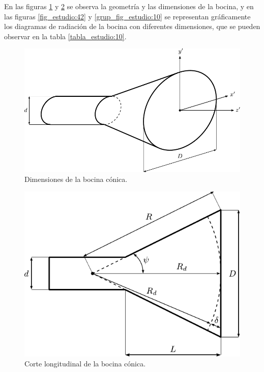 En las figuras \ref{fig_estudio:40} y \ref{fig_estudio:41} se observa la geometría y las dimensiones de la bocina, y en las figuras \ref{fig_estudio:42} y \ref{grup_fig_estudio:10} se representan gráficamente los diagramas de radiación de la bocina con diferentes dimensiones, que se pueden observar en la tabla \ref{tabla_estudio:10}.
\begin{figure}[H]
\centering
\includegraphics[scale = 1]{Figures/Estudio/estudio_40}
\caption{Dimensiones de la bocina cónica.}
\label{fig_estudio:40}
\end{figure}
\begin{figure}[H]
\centering
\includegraphics[scale = 1]{Figures/Estudio/estudio_41}
\caption{Corte longitudinal de la bocina cónica.}
\label{fig_estudio:41}
\end{figure}
